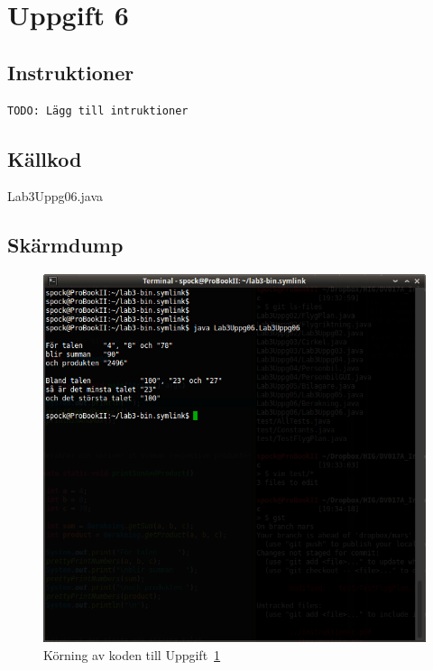 \section{Uppgift 6}\label{sec:uppg06}

\subsection{Instruktioner}
\begin{verbatim}
TODO: Lägg till intruktioner
\end{verbatim}


\subsection{Källkod}
\caption{Lab3Uppg06.java}
\label{src:uppg06}


\subsection{Skärmdump}
\begin{figure}[htbp]
    \centering
        \includegraphics[width=\linewidth]{img/06.png}
    \caption{Körning av koden till Uppgift~\ref{sec:uppg06}}
    \label{fig:uppg06-screenshot}
\end{figure}

